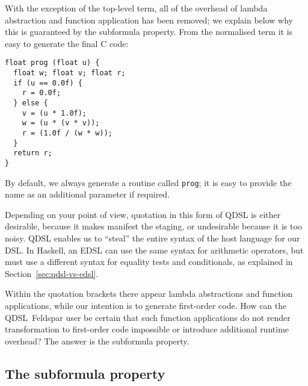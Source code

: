 \documentclass[authoryear,9pt]{sigplanconf}
\newcommand{\todo}[2]{}
\begin{document}
With the exception of the top-level term, all of the overhead of
lambda abstraction and function application has been removed; we
explain below why this is guaranteed by the subformula property.
From the normalised term it is easy to generate the final C code:
\begin{lstlisting}
float prog (float u) {
  float w; float v; float r;
  if (u == 0.0f) {
    r = 0.0f;
  } else {
    v = (u * 1.0f);
    w = (u * (v * v));
    r = (1.0f / (w * w));
  }
  return r;
}
\end{lstlisting}
By default, we always generate a routine called \texttt{prog};
it is easy to provide the name as an additional parameter if required.



Depending on your point of view, quotation in this form of QDSL is
either desirable, because it makes manifest the staging, or
undesirable because it is too noisy.  QDSL enables us to ``steal'' the
entire syntax of the host language for our DSL.  In Haskell, an EDSL can
use the same syntax for arithmetic operators, but must use a different
syntax for equality tests and conditionals, as explained in
Section~\ref{sec:qdsl-vs-edsl}.

Within the quotation brackets there appear lambda abstractions and
function applications, while our intention is to generate first-order
code. How can the QDSL~Feldspar user be certain that such function
applications do not render transformation to first-order code
impossible or introduce additional runtime overhead?
The answer is the subformula property.
\\
\todo{Shayan}{Suggest rephrasing}


\subsection{The subformula property}
\label{subsec:subformula}
\end{document}
